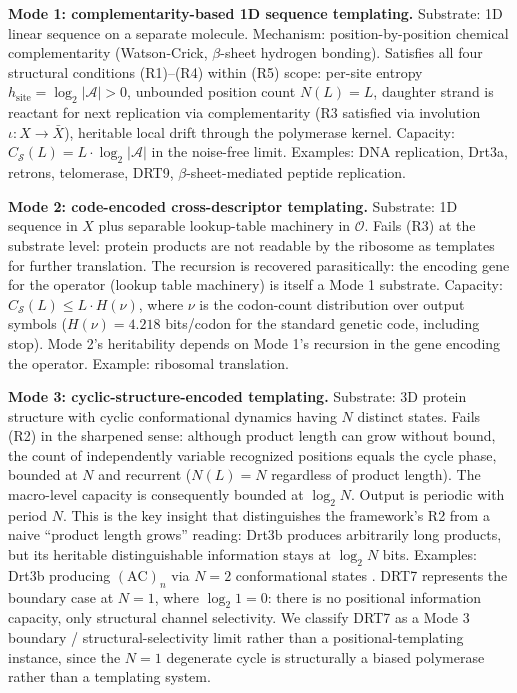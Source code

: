 \documentclass[aps,prx,reprint,amsmath,amssymb,floatfix,superscriptaddress,nofootinbib]{revtex4-2}
\theoremstyle{plain-thm}
\theoremstyle{definition-thm}
\newcommand{\Csub}{C_{\mathcal{S}}}
\newcommand{\Op}{\mathcal{O}}
\begin{document}
\textbf{Mode 1: complementarity-based 1D sequence templating.} Substrate: 1D linear sequence on a separate molecule. Mechanism: position-by-position chemical complementarity (Watson-Crick, $\beta$-sheet hydrogen bonding). Satisfies all four structural conditions (R1)--(R4) within (R5) scope: per-site entropy $h_{\mathrm{site}} = \log_2 |\mathcal{A}| > 0$, unbounded position count $N(L) = L$, daughter strand is reactant for next replication via complementarity (R3 satisfied via involution $\iota: X \to \bar{X}$), heritable local drift through the polymerase kernel. Capacity: $\Csub(L) = L \cdot \log_2 |\mathcal{A}|$ in the noise-free limit. Examples: DNA replication, Drt3a, retrons, telomerase, DRT9, $\beta$-sheet-mediated peptide replication.

\textbf{Mode 2: code-encoded cross-descriptor templating.} Substrate: 1D sequence in $X$ plus separable lookup-table machinery in $\Op$. Fails (R3) at the substrate level: protein products are not readable by the ribosome as templates for further translation. The recursion is recovered parasitically: the encoding gene for the operator (lookup table machinery) is itself a Mode 1 substrate. Capacity: $\Csub(L) \le L \cdot H(\nu)$, where $\nu$ is the codon-count distribution over output symbols ($H(\nu) = 4.218$ bits/codon for the standard genetic code, including stop). Mode 2's heritability depends on Mode 1's recursion in the gene encoding the operator. Example: ribosomal translation.

\textbf{Mode 3: cyclic-structure-encoded templating.} Substrate: 3D protein structure with cyclic conformational dynamics having $N$ distinct states. Fails (R2) in the sharpened sense: although product length can grow without bound, the count of independently variable recognized positions equals the cycle phase, bounded at $N$ and recurrent ($N(L) = N$ regardless of product length). The macro-level capacity is consequently bounded at $\log_2 N$. Output is periodic with period $N$. This is the key insight that distinguishes the framework's R2 from a naive ``product length grows'' reading: Drt3b produces arbitrarily long products, but its heritable distinguishable information stays at $\log_2 N$ bits. Examples: Drt3b producing $(\mathrm{AC})_n$ via $N=2$ conformational states \citep{Deng2026}. DRT7 represents the boundary case at $N=1$, where $\log_2 1 = 0$: there is no positional information capacity, only structural channel selectivity. We classify DRT7 as a Mode 3 boundary / structural-selectivity limit rather than a positional-templating instance, since the $N=1$ degenerate cycle is structurally a biased polymerase rather than a templating system.
\end{document}
